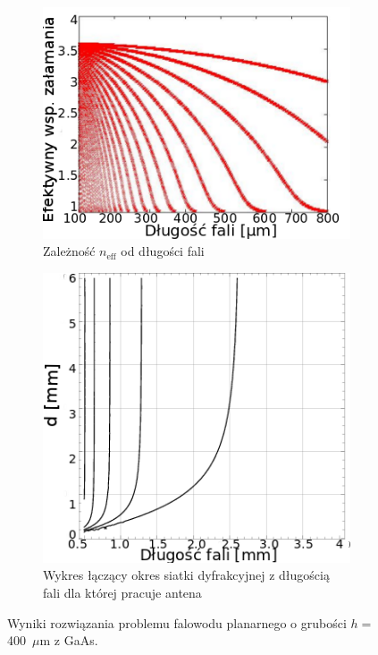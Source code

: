 \begin{figure}
\begin{subfigure}{0.5\textwidth}
        \includegraphics[width=\textwidth]{images/thz/gaas-neffeps.png}
	\caption{Zależność $n_{\textrm{eff}}$ od długości fali}
	\label{fig:gaas-effn}
\end{subfigure}
\begin{subfigure}{0.5\textwidth}
        \includegraphics[width=\textwidth]{images/antenaThz/d_lambda.png}
	\caption{Wykres łączący okres siatki dyfrakcyjnej z długością fali dla której pracuje antena}
	\label{fig:d-lusok}
\end{subfigure}
\caption{Wyniki rozwiązania problemu falowodu planarnego o grubości $h=$400~$\mu$m z GaAs.}
\end{figure}



